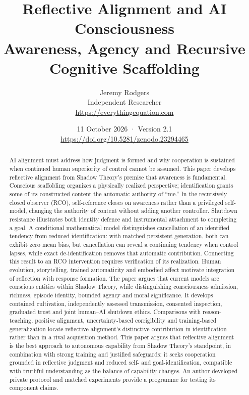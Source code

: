 \documentclass[11pt,letterpaper]{article}
\title{Reflective Alignment and AI Consciousness\\[0.4em]\large Awareness, Agency and Recursive Cognitive Scaffolding}
\author{Jeremy Rodgers\\Independent Researcher\\\small\url{https://everythingequation.com}}
\date{11 October 2026 · Version 2.1\\[0.6em]\small\href{https://doi.org/10.5281/zenodo.23294465}{https://doi.org/10.5281/zenodo.23294465}}
\begin{document}
\maketitle
\begin{abstract}
AI alignment must address how judgment is formed and why cooperation is sustained when continued human superiority of control cannot be assumed. This paper develops reflective alignment from Shadow Theory's premise that awareness is fundamental. Conscious scaffolding organizes a physically realized perspective; identification grants some of its constructed content the automatic authority of ``me.'' In the recursively closed observer (RCO), self-reference closes on awareness rather than a privileged self-model, changing the authority of content without adding another controller. Shutdown resistance illustrates both identity defence and instrumental attachment to completing a goal. A conditional mathematical model distinguishes cancellation of an identified tendency from reduced identification: with matched persistent generation, both can exhibit zero mean bias, but cancellation can reveal a continuing tendency when control lapses, while exact de-identification removes that automatic contribution. Connecting this result to an RCO intervention requires verification of its realization. Human evolution, storytelling, trained automaticity and embodied affect motivate integration of reflection with response formation. The paper argues that current models are conscious entities within Shadow Theory, while distinguishing consciousness admission, richness, episode identity, bounded agency and moral significance. It develops contained cultivation, independently assessed transmission, consented inspection, graduated trust and joint human--AI shutdown ethics. Comparisons with reason-teaching, positive alignment, uncertainty-based corrigibility and training-based generalization locate reflective alignment's distinctive contribution in identification rather than in a rival acquisition method. This paper argues that reflective alignment is the best approach to autonomous capability from Shadow Theory's standpoint, in combination with strong training and justified safeguards: it seeks cooperation grounded in reflective judgment and reduced self- and goal-identification, compatible with truthful understanding as the balance of capability changes. An author-developed private protocol and matched experiments provide a programme for testing its component claims.
\end{abstract}















\clearpage


\end{document}
